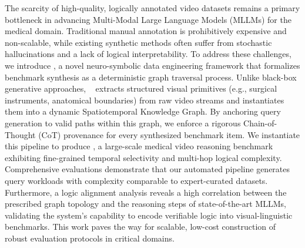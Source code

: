 The scarcity of high-quality, logically annotated video datasets remains a primary bottleneck in advancing Multi-Modal Large Language Models (MLLMs) for the medical domain. Traditional manual annotation is prohibitively expensive and non-scalable, while existing synthetic methods often suffer from stochastic hallucinations and a lack of logical interpretability. To address these challenges, we introduce \textbf{\PipelineName}, a novel neuro-symbolic data engineering framework that formalizes benchmark synthesis as a deterministic graph traversal process.
Unlike black-box generative approaches, \PipelineName~ extracts structured visual primitives (e.g., surgical instruments, anatomical boundaries) from raw video streams and instantiates them into a dynamic Spatiotemporal Knowledge Graph. By anchoring query generation to valid paths within this graph, we enforce a rigorous Chain-of-Thought (CoT) provenance for every synthesized benchmark item. We instantiate this pipeline to produce \BenchmarkName, a large-scale medical video reasoning benchmark exhibiting fine-grained temporal selectivity and multi-hop logical complexity.
Comprehensive evaluations demonstrate that our automated pipeline generates query workloads with complexity comparable to expert-curated datasets. Furthermore, a logic alignment analysis reveals a high correlation between the prescribed graph topology and the reasoning steps of state-of-the-art MLLMs, validating the system's capability to encode verifiable logic into visual-linguistic benchmarks. This work paves the way for scalable, low-cost construction of robust evaluation protocols in critical domains.

